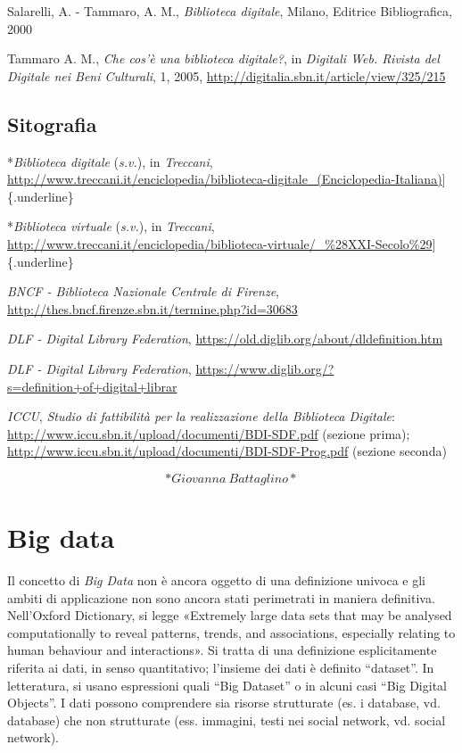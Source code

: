 \documentclass[
  b5paper,
  twoside,
  12pt,
  chapterprefix=false,
  bibliography=totocnumbered,
  parskip=false]{scrbook}
\begin{document}
Salarelli, A. - Tammaro, A. M., \emph{Biblioteca digitale}, Milano, Editrice
Bibliografica, 2000

Tammaro A. M., \emph{Che cos'è una biblioteca digitale?}, in \emph{Digitali Web.
Rivista del Digitale nei Beni Culturali}, 1, 2005,
\url{http://digitalia.sbn.it/article/view/325/215}

\hypertarget{sitografia-2}{%
\section*{Sitografia}\label{sitografia-2}}

*\emph{Biblioteca digitale} (\emph{s.v.}), in \emph{Treccani},
\url{http://www.treccani.it/enciclopedia/biblioteca-digitale_(Enciclopedia-Italiana)}{]}\{.underline\}

*\emph{Biblioteca virtuale} (\emph{s.v.}), in \emph{Treccani},
\url{http://www.treccani.it/enciclopedia/biblioteca-virtuale/_\%28XXI-Secolo\%29}{]}\{.underline\}

\emph{BNCF - Biblioteca Nazionale Centrale di Firenze},
\url{http://thes.bncf.firenze.sbn.it/termine.php?id=30683}

\emph{DLF - Digital Library Federation},
\url{https://old.diglib.org/about/dldefinition.htm}

\emph{DLF - Digital Library Federation},
\url{https://www.diglib.org/?s=definition+of+digital+librar}

\emph{ICCU}, \emph{Studio di fattibilità per la realizzazione della Biblioteca
Digitale}:
\url{http://www.iccu.sbn.it/upload/documenti/BDI-SDF.pdf}
(sezione prima);
\url{http://www.iccu.sbn.it/upload/documenti/BDI-SDF-Prog.pdf}
(sezione seconda)

\[*Giovanna~Battaglino*\]

\hypertarget{big-data}{%
\chapter{Big data}\label{big-data}}

Il concetto di \emph{Big Data} non è ancora oggetto di una definizione
univoca e gli ambiti di applicazione non sono ancora stati perimetrati
in maniera definitiva. Nell'Oxford Dictionary, si legge «Extremely large
data sets that may be analysed computationally to reveal patterns,
trends, and associations, especially relating to human behaviour and
interactions». Si tratta di una definizione esplicitamente riferita ai
dati, in senso quantitativo; l'insieme dei dati è definito \enquote{dataset}. In
letteratura, si usano espressioni quali \enquote{Big Dataset} o in alcuni casi
\enquote{Big Digital Objects}. I dati possono comprendere sia risorse
strutturate (es. i database, vd. database) che non strutturate (ess.
immagini, testi nei social network, vd. social network).
\end{document}
